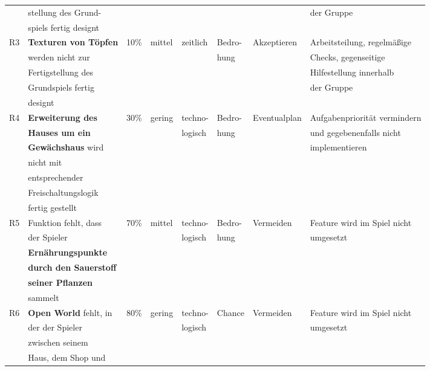 \begin{table}[H]
\begin{tabular}{|c|l|l|l|l|l|l|l|}
        & stellung des Grund- &  &  &  &&  & der Gruppe \\
        & spiels fertig designt &  &  &  & & &  \\
        \hline
        R3 & \textbf{Texturen von Töpfen} & 10\% & mittel & zeitlich & Bedro- & Akzeptieren & Arbeitsteilung, regelmäßige \\
        & werden nicht zur &  &  &  &hung&  & Checks, gegenseitige \\
        & Fertigstellung des &  &  & & &  & Hilfestellung innerhalb \\
        & Grundspiels fertig &  &  &  &&  & der Gruppe \\
        & designt &  &  &  &  &&  \\
        \hline
        R4 & \textbf{Erweiterung des} & 30\% & gering & techno- & Bedro- & Eventualplan & Aufgabenpriorität vermindern \\
        & \textbf{Hauses um ein} &  &  & logisch & hung&  & und gegebenenfalls nicht \\
        & \textbf{Gewächshaus} wird &  &  & & &  & implementieren \\
        & nicht mit &  &  &  &  & & \\
        & entsprechender &  &  &  &&  &  \\
        & Freischaltungslogik &  &  &&  &  &  \\
        & fertig gestellt &  &  &  & & &  \\
        \hline
        R5 & Funktion fehlt, dass & 70\% & mittel & techno- & Bedro- & Vermeiden & Feature wird im Spiel nicht \\
        & der Spieler &  &  & logisch &hung  &  &umgesetzt \\
        & \textbf{Ernährungspunkte} &&  &  &  &  &  \\
        & \textbf{durch den Sauerstoff} &&  &  &  &  &  \\
        & \textbf{seiner Pflanzen} &  &  &&  &  &  \\
        & sammelt &  &  &  &  &  &\\
        \hline
        R6 & \textbf{Open World} fehlt, in & 80\% & gering & techno- & Chance & Vermeiden &  Feature wird im Spiel nicht \\
        & der der Spieler &  &  & logisch& &  & umgesetzt \\
        & zwischen seinem &  &  &  &&  &  \\
        & Haus, dem Shop und &  &  &&  &  &  \\

\end{tabular}
\end{table}
